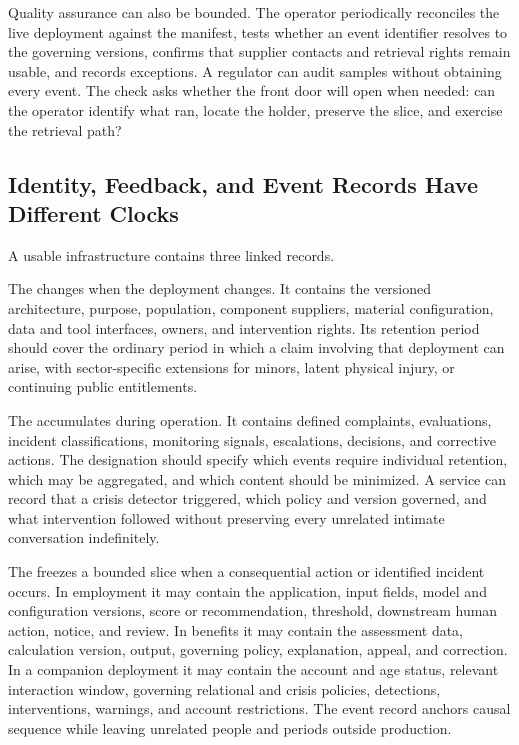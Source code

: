 Quality assurance can also be bounded. The operator periodically reconciles the live deployment against the manifest, tests whether an event identifier resolves to the governing versions, confirms that supplier contacts and retrieval rights remain usable, and records exceptions. A regulator can audit samples without obtaining every event. The check asks whether the front door will open when needed: can the operator identify what ran, locate the holder, preserve the slice, and exercise the retrieval path?

\subsection{Identity, Feedback, and Event Records Have Different Clocks}

A usable infrastructure contains three linked records.

The  changes when the deployment changes. It contains the versioned architecture, purpose, population, component suppliers, material configuration, data and tool interfaces, owners, and intervention rights. Its retention period should cover the ordinary period in which a claim involving that deployment can arise, with sector-specific extensions for minors, latent physical injury, or continuing public entitlements.

The  accumulates during operation. It contains defined complaints, evaluations, incident classifications, monitoring signals, escalations, decisions, and corrective actions. The designation should specify which events require individual retention, which may be aggregated, and which content should be minimized. A service can record that a crisis detector triggered, which policy and version governed, and what intervention followed without preserving every unrelated intimate conversation indefinitely.

The  freezes a bounded slice when a consequential action or identified incident occurs. In employment it may contain the application, input fields, model and configuration versions, score or recommendation, threshold, downstream human action, notice, and review. In benefits it may contain the assessment data, calculation version, output, governing policy, explanation, appeal, and correction. In a companion deployment it may contain the account and age status, relevant interaction window, governing relational and crisis policies, detections, interventions, warnings, and account restrictions. The event record anchors causal sequence while leaving unrelated people and periods outside production.

